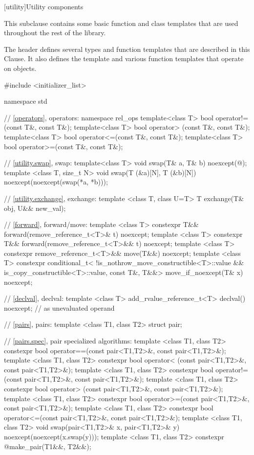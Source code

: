 [utility]{Utility components}

\pnum
This subclause contains some basic function and class templates that are used
throughout the rest of the library.

%
%

\pnum
The header  defines several types and function templates
that are described in this Clause. It also defines the template 
and various function templates that operate on  objects.

\begin{codeblock}
#include <initializer_list>

namespace std {
  // \ref{operators}, operators:
  namespace rel_ops {
    template<class T> bool operator!=(const T&, const T&);
    template<class T> bool operator> (const T&, const T&);
    template<class T> bool operator<=(const T&, const T&);
    template<class T> bool operator>=(const T&, const T&);
  }

  // \ref{utility.swap}, swap:
  template<class T> void swap(T& a, T& b) noexcept(@\seebelow@);
  template <class T, size_t N> void swap(T (&a)[N], T (&b)[N]) noexcept(noexcept(swap(*a, *b)));

  // \ref{utility.exchange}, exchange:
  template <class T, class U=T> T exchange(T& obj, U&& new_val);

  // \ref{forward}, forward/move:
  template <class T> 
    constexpr T&& forward(remove_reference_t<T>& t) noexcept;
  template <class T>
    constexpr T&& forward(remove_reference_t<T>&& t) noexcept;
  template <class T>
    constexpr remove_reference_t<T>&& move(T&&) noexcept;
  template <class T>
    constexpr conditional_t<
    !is_nothrow_move_constructible<T>::value && is_copy_constructible<T>::value,
    const T&, T&&> move_if_noexcept(T& x) noexcept;

  // \ref{declval}, declval:
  template <class T>
    add_rvalue_reference_t<T> declval() noexcept;  // as unevaluated operand

  // \ref{pairs}, pairs:
  template <class T1, class T2> struct pair;

  // \ref{pairs.spec}, pair specialized algorithms:
  template <class T1, class T2>
    constexpr bool operator==(const pair<T1,T2>&, const pair<T1,T2>&);
  template <class T1, class T2>
    constexpr bool operator< (const pair<T1,T2>&, const pair<T1,T2>&);
  template <class T1, class T2>
    constexpr bool operator!=(const pair<T1,T2>&, const pair<T1,T2>&);
  template <class T1, class T2>
    constexpr bool operator> (const pair<T1,T2>&, const pair<T1,T2>&);
  template <class T1, class T2>
    constexpr bool operator>=(const pair<T1,T2>&, const pair<T1,T2>&);
  template <class T1, class T2>
    constexpr bool operator<=(const pair<T1,T2>&, const pair<T1,T2>&);
  template <class T1, class T2>
    void swap(pair<T1,T2>& x, pair<T1,T2>& y) noexcept(noexcept(x.swap(y)));
  template <class T1, class T2>
    constexpr @\seebelow@ make_pair(T1&&, T2&&);

}
\end{codeblock}
